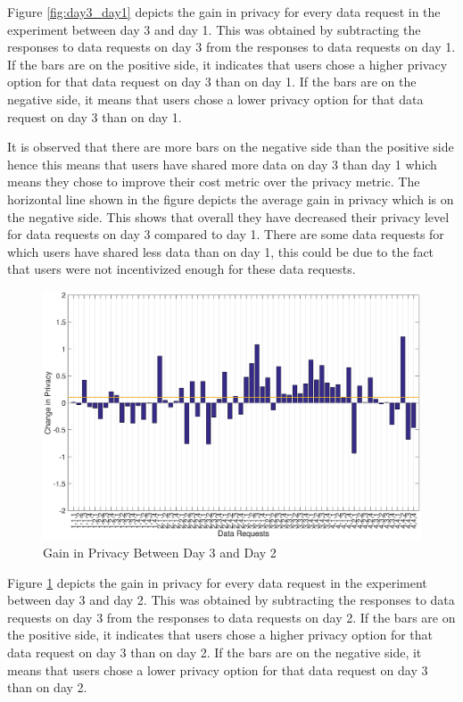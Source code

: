 Figure \ref{fig:day3_day1} depicts the gain in privacy for every data request in the experiment between day 3 and day 1. This was obtained by subtracting the responses to data requests on day 3 from the responses to data requests on day 1. If the bars are on the positive side, it indicates that users chose a higher privacy option for that data request on day 3 than on day 1. If the bars are on the negative side, it means that users chose a lower privacy option for that data request on day 3 than on day 1.

It is observed that there are more bars on the negative side than the positive side hence this means that users have shared more data on day 3 than day 1 which means they chose to improve their cost metric over the privacy metric. The horizontal line shown in the figure depicts the average gain in privacy which is on the negative side. This shows that overall they have decreased their privacy level for data requests on day 3 compared to day 1. There are some data requests for which users have shared less data than on day 1, this could be due to the fact that users were not incentivized enough for these data requests.

\begin{figure}[ht!]
\centering
\includegraphics[width=\textwidth]{./images/day3_day2}
\caption{Gain in Privacy Between Day 3 and Day 2}
\label{fig:day3_day2}
\end{figure}

Figure \ref{fig:day3_day2} depicts the gain in privacy for every data request in the experiment between day 3 and day 2. This was obtained by subtracting the responses to data requests on day 3 from the responses to data requests on day 2. If the bars are on the positive side, it indicates that users chose a higher privacy option for that data request on day 3 than on day 2. If the bars are on the negative side, it means that users chose a lower privacy option for that data request on day 3 than on day 2.

